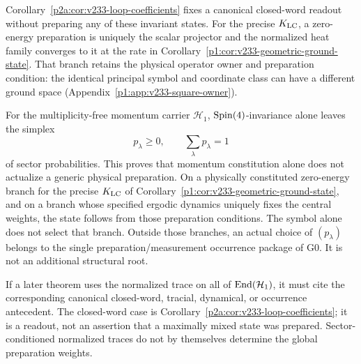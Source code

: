 \documentclass[12pt,a4paper]{article}
\begin{document}
\begin{remark}
Corollary~\ref{p2a:cor:v233-loop-coefficients} fixes a canonical
closed-word readout without preparing any of these invariant states.
For the precise \(K_{\rm LC}\), a zero-energy preparation is uniquely
the scalar projector and the normalized heat family converges to it
at the rate in Corollary~\ref{p1:cor:v233-geometric-ground-state}.
That branch retains the physical operator owner and preparation
condition: the identical principal symbol and coordinate class can
have a different ground space
(Appendix~\ref{p1:app:v233-square-owner}).
\end{remark}


\begin{remark}
\label{p2b:rem:invariant-state-selector-status}
For the multiplicity-free momentum carrier \(\mathcal H_1\),
\(\mathrm{Spin}(4)\)-invariance alone leaves the simplex
\[
 p_\lambda\ge0,\qquad \sum_\lambda p_\lambda=1
\]
of sector probabilities.  This proves that momentum constitution alone does
not actualize a generic physical preparation.  On a physically constituted zero-energy branch for the precise
\(K_{\rm LC}\) of Corollary~\ref{p1:cor:v233-geometric-ground-state},
and on a branch whose specified ergodic dynamics uniquely fixes the
central weights, the state follows from those preparation conditions.
The symbol alone does not select that branch.  Outside those branches, an actual choice of
\((p_\lambda)\) belongs to the single preparation/measurement occurrence
package of G0.  It is not an additional structural root.

If a later theorem uses the normalized trace on all of
\(\operatorname{End}(\mathcal H_1)\), it must cite the corresponding canonical closed-word, tracial,
dynamical, or occurrence antecedent. The closed-word case is
Corollary~\ref{p2a:cor:v233-loop-coefficients}; it is a readout,
not an assertion that a maximally mixed state was prepared.  Sector-conditioned normalized traces do not by
themselves determine the global preparation weights.
\end{remark}
\end{document}
